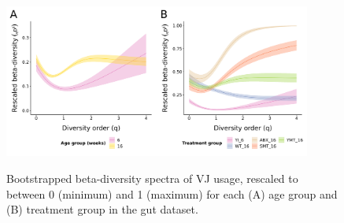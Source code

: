 \begin{figure}
\centering
\includegraphics[width = 0.9\textwidth]{_Figures/png/igseq-gut-VJ-diversity-beta}
\begin{subfigure}{0em}
\label{fig:igseq-gut-VJ-diversity-beta-age}
\end{subfigure}
\begin{subfigure}{0em}
\label{fig:igseq-gut-VJ-diversity-beta-groups}
\end{subfigure}
\caption{Bootstrapped beta-diversity spectra of VJ usage, rescaled to between 0 (minimum) and 1 (maximum) for each (A) age group and (B) treatment group in the \igseq gut dataset.}
\label{fig:igseq-gut-VJ-diversity-beta}
\end{figure}

